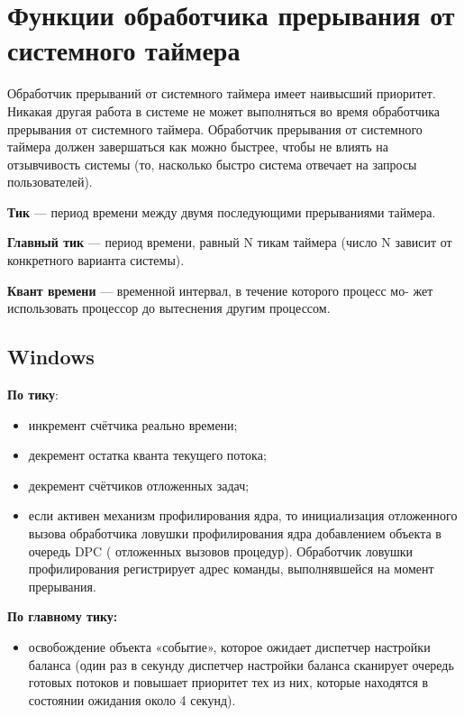 


	


\normalsize

\setcounter{page}{2}

\clearpage

\section{Функции обработчика прерывания от системного таймера}

Обработчик прерываний от системного таймера имеет наивысший приоритет. Никакая другая работа в системе не может выполняться во время обработчика прерывания от системного таймера. Обработчик прерывания от системного таймера должен завершаться как можно быстрее, чтобы не влиять на отзывчивость системы (то, насколько быстро система отвечает на запросы пользователей).

\textbf{Тик} --- период времени между двумя последующими прерываниями таймера.

\textbf{Главный тик} --- период времени, равный N тикам таймера (число N зависит от конкретного варианта системы).

\textbf{Квант времени} --- временной интервал, в течение которого процесс мо-
жет использовать процессор до вытеснения другим процессом.

\subsection{Windows}

\textbf{По тику}:
\begin{itemize}[label=---]
	\item инкремент счётчика реально времени;
	\item декремент остатка кванта текущего потока;
	\item декремент счётчиков отложенных задач;
	\item если активен механизм профилирования ядра, то инициализация отложенного вызова обработчика ловушки профилирования ядра добавлением объекта в очередь DPC ( отложенных вызовов процедур). Обработчик ловушки профилирования регистрирует адрес команды, выполнявшейся на момент прерывания. 
\end{itemize}

\textbf{По главному тику:} 
\begin{itemize}[label=---]
	\item освобождение объекта «событие», которое ожидает диспетчер настройки баланса (один раз в секунду диспетчер настройки баланса сканирует
	очередь готовых потоков и повышает приоритет тех из них, которые находятся в состоянии ожидания около 4 секунд).
\end{itemize}

